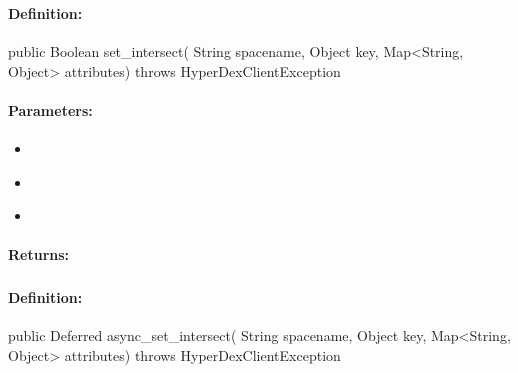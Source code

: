 \subsubsection{}
\label{api:java:set_intersect}


\paragraph{Definition:}
\begin{javacode}
public Boolean set_intersect(
        String spacename,
        Object key,
        Map<String, Object> attributes) throws HyperDexClientException
\end{javacode}

\paragraph{Parameters:}
\begin{itemize}[noitemsep]
\item {}\\

\item {}\\

\item {}\\

\end{itemize}

\paragraph{Returns:}


\pagebreak
\subsubsection{}
\label{api:java:async_set_intersect}


\paragraph{Definition:}
\begin{javacode}
public Deferred async_set_intersect(
        String spacename,
        Object key,
        Map<String, Object> attributes) throws HyperDexClientException
\end{javacode}

